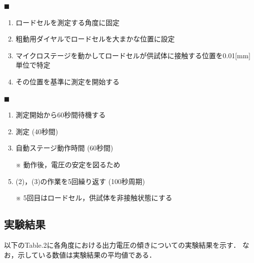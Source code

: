 \documentclass[twocolumn,a4j]{jsarticle}
\begin{document}
$\blacksquare$ 
    \begin{enumerate}[(1)]
        \item ロードセルを測定する角度に固定
        \item 粗動用ダイヤルでロードセルを大まかな位置に設定
        \item マイクロステージを動かしてロードセルが供試体に接触する位置を0.01[mm]単位で特定
        \item その位置を基準に測定を開始する
    \end{enumerate}

$\blacksquare$ 
    \begin{enumerate}[(1)]
        \item 測定開始から60秒間待機する
        \item 測定 (40秒間)
        \item 自動ステージ動作時間 (60秒間)
        \item [※] 動作後，電圧の安定を図るため
        \item (2)，(3)の作業を5回繰り返す (100秒周期)
        \item [※] 5回目はロードセル，供試体を非接触状態にする
    \end{enumerate}

\subsection{実験結果}

以下のTable.2に各角度における出力電圧の傾きについての実験結果を示す．
なお，示している数値は実験結果の平均値である．
\end{document}
